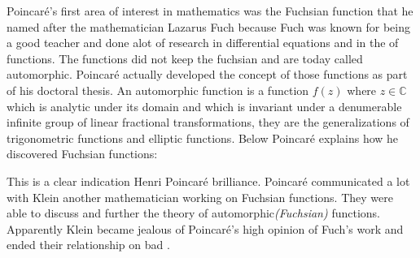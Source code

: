 \documentclass[12pt]{article}
\begin{document}
Poincar\'e's first area of interest in mathematics was the Fuchsian function that he named after the mathematician Lazarus Fuch because Fuch was known for being a good teacher and done alot of research in differential equations and in the  of functions.  The functions did not keep the  fuchsian and are today called automorphic.  Poincar\'e actually developed the concept of those functions as part of his doctoral thesis.\cite{MT}  An automorphic function is a function $f(z)$ where $z\in \mathbb{C}$ which is analytic under its domain and which is invariant under a denumerable infinite group of linear fractional transformations, they are the generalizations of trigonometric functions and elliptic functions.  Below Poincar\'e explains how he discovered Fuchsian functions:
\begin{quote}
 \cite{PHSM}
\end{quote}
This is a clear indication Henri Poincar\'e brilliance. Poincar\'e communicated a lot with Klein another mathematician working on Fuchsian functions. They were able to discuss and further the theory of automorphic\textsl{(Fuchsian)} functions.  Apparently Klein became jealous of Poincar\'e's high opinion of Fuch's work and ended their relationship on bad .  
\end{document}
